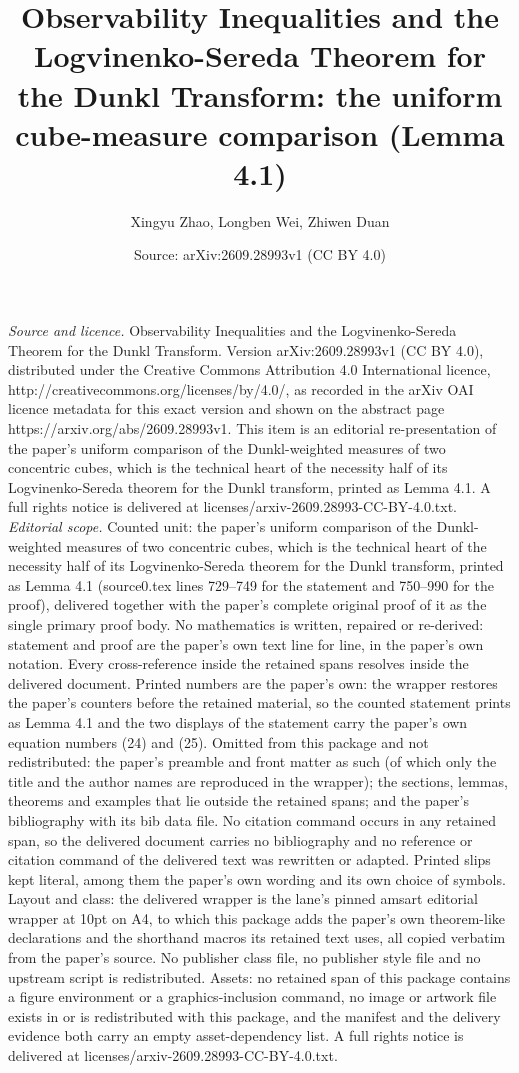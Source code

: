 \documentclass[10pt,a4paper]{amsart}
\title[Logvinenko-Sereda for the Dunkl transform]{Observability Inequalities and the Logvinenko-Sereda Theorem for the Dunkl Transform: the uniform cube-measure comparison (Lemma 4.1)}
\author[X. Zhao, L. Wei, Z. Duan]{Xingyu Zhao, Longben Wei, Zhiwen Duan}
\date{Source: arXiv:2609.28993v1 (CC BY 4.0)}
\begin{document}
\maketitle
\vspace{1em}
\noindent\textit{Source and licence.} Observability Inequalities and the Logvinenko-Sereda Theorem for the Dunkl Transform. Version arXiv:2609.28993v1 (CC BY 4.0), distributed under the Creative Commons Attribution 4.0 International licence, http://creativecommons.org/licenses/by/4.0/, as recorded in the arXiv OAI licence metadata for this exact version and shown on the abstract page https://arxiv.org/abs/2609.28993v1. This item is an editorial re-presentation of the paper's uniform comparison of the Dunkl-weighted measures of two concentric cubes, which is the technical heart of the necessity half of its Logvinenko-Sereda theorem for the Dunkl transform, printed as Lemma 4.1. A full rights notice is delivered at licenses/arxiv-2609.28993-CC-BY-4.0.txt.
\noindent\textit{Editorial scope.} Counted unit: the paper's uniform comparison of the Dunkl-weighted measures of two concentric cubes, which is the technical heart of the necessity half of its Logvinenko-Sereda theorem for the Dunkl transform, printed as Lemma 4.1 (source0.tex lines 729--749 for the statement and 750--990 for the proof), delivered together with the paper's complete original proof of it as the single primary proof body. No mathematics is written, repaired or re-derived: statement and proof are the paper's own text line for line, in the paper's own notation. Every cross-reference inside the retained spans resolves inside the delivered document. Printed numbers are the paper's own: the wrapper restores the paper's counters before the retained material, so the counted statement prints as Lemma 4.1 and the two displays of the statement carry the paper's own equation numbers (24) and (25). Omitted from this package and not redistributed: the paper's preamble and front matter as such (of which only the title and the author names are reproduced in the wrapper); the sections, lemmas, theorems and examples that lie outside the retained spans; and the paper's bibliography with its bib data file. No citation command occurs in any retained span, so the delivered document carries no bibliography and no reference or citation command of the delivered text was rewritten or adapted. Printed slips kept literal, among them the paper's own wording and its own choice of symbols. Layout and class: the delivered wrapper is the lane's pinned amsart editorial wrapper at 10pt on A4, to which this package adds the paper's own theorem-like declarations and the shorthand macros its retained text uses, all copied verbatim from the paper's source. No publisher class file, no publisher style file and no upstream script is redistributed. Assets: no retained span of this package contains a figure environment or a graphics-inclusion command, no image or artwork file exists in or is redistributed with this package, and the manifest and the delivery evidence both carry an empty asset-dependency list. A full rights notice is delivered at licenses/arxiv-2609.28993-CC-BY-4.0.txt.
\end{document}
